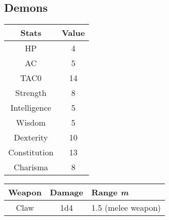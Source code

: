 \subsection{Demons}
\begin{table}[H]
  \centering
  \begin{tabular}{|c|c|}
    \hline
    \rowcolor[HTML]{C0C0C0}
    \textbf{Stats} & \textbf{Value} \\ \hline
    HP & 4 \\ \hline
    AC & 5 \\ \hline
    TAC0 & 14 \\ \hline
    Strength & 8 \\ \hline
    Intelligence & 5 \\ \hline
    Wisdom & 5  \\ \hline
    Dexterity & 10 \\ \hline
    Constitution & 13 \\ \hline
    Charisma & 8 \\ \hline
  \end{tabular}
\end{table}
\begin{table}[H]
  \centering
  \begin{tabular}{|l|l|l|}
    \hline
    \rowcolor[HTML]{C0C0C0}
    \textbf{Weapon} & \textbf{Damage} & \textbf{Range \textit{m}} \\ \hline
    \multicolumn{1}{|c|}{Claw} & \multicolumn{1}{c|}{1d4} & \multicolumn{1}{c|}{1.5 (melee weapon)} \\ \hline
  \end{tabular}
\end{table}

